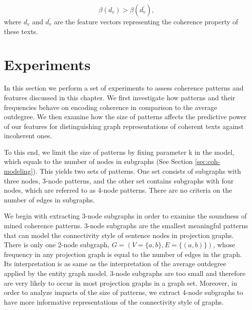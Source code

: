 \begin{equation}
\beta (d_v) > \beta (d^\prime_v),
\end{equation}
where $d_v$ and $d^\prime_v$ are the feature vectors representing the coherence property of these texts. 

\section{Experiments}
\label{sec:exp}

In this section we perform a set of experiments to assess coherence patterns and features discussed in this chapter. 
We first investigate how patterns and their frequencies behave on encoding coherence in comparison to the average outdegree.  
We then examine how the size of patterns affects the predictive power of our features for distinguishing graph representations of coherent texts against incoherent ones. 

To this end, we limit the size of patterns by fixing parameter k in the model, which equals to the number of nodes in subgraphs (See Section \ref{sec:coh-modeling}). 
This yields two sets of patterns. 
One set consists of subgraphs with three nodes, 3-node patterns, and the other set contains subgraphs with four nodes, which are referred to as 4-node patterns.  
There are no criteria on the number of edges in subgraphs.  

We begin with extracting 3-node subgraphs in order to examine the soundness of mined coherence patterns.  
3-node subgraphs are the smallest meaningful patterns that can model the connectivity style of sentence nodes in projection graphs. 
There is only one 2-node subgraph, $G = \left( V = \lbrace a,b \rbrace, E=\lbrace \left( a, b \right) \rbrace \right)$, whose frequency in any projection graph is equal to the number of edges in the graph. 
Its interpretation is as same as the interpretation of the average outdegree applied by the entity graph model.  
3-node subgraphs are too small and therefore are very likely to occur in most projection graphs in a graph set. 
Moreover, in order to analyze impacts of the size of patterns, we extract 4-node subgraphs to have more informative representations of the connectivity style of graphs. 

